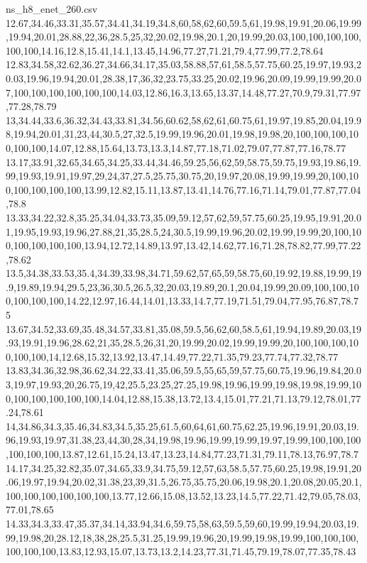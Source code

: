 \begin{filecontents*}[overwrite]{ns_h8_enet_260.csv}
12.67,34.46,33.31,35.57,34.41,34.19,34.8,60,58,62,60,59.5,61,19.98,19.91,20.06,19.99,19.94,20.01,28.88,22,36,28.5,25,32,20.02,19.98,20.1,20,19.99,20.03,100,100,100,100,100,100,14.16,12.8,15.41,14.1,13.45,14.96,77.27,71.21,79.4,77.99,77.2,78.64
12.83,34.58,32.62,36.27,34.66,34.17,35.03,58.88,57,61,58.5,57.75,60.25,19.97,19.93,20.03,19.96,19.94,20.01,28.38,17,36,32,23.75,33.25,20.02,19.96,20.09,19.99,19.99,20.07,100,100,100,100,100,100,14.03,12.86,16.3,13.65,13.37,14.48,77.27,70.9,79.31,77.97,77.28,78.79
13,34.44,33.6,36.32,34.43,33.81,34.56,60.62,58,62,61,60.75,61,19.97,19.85,20.04,19.98,19.94,20.01,31,23,44,30.5,27,32.5,19.99,19.96,20.01,19.98,19.98,20,100,100,100,100,100,100,14.07,12.88,15.64,13.73,13.3,14.87,77.18,71.02,79.07,77.87,77.16,78.77
13.17,33.91,32.65,34.65,34.25,33.44,34.46,59.25,56,62,59,58.75,59.75,19.93,19.86,19.99,19.93,19.91,19.97,29,24,37,27.5,25.75,30.75,20,19.97,20.08,19.99,19.99,20,100,100,100,100,100,100,13.99,12.82,15.11,13.87,13.41,14.76,77.16,71.14,79.01,77.87,77.04,78.8
13.33,34.22,32.8,35.25,34.04,33.73,35.09,59.12,57,62,59,57.75,60.25,19.95,19.91,20.01,19.95,19.93,19.96,27.88,21,35,28.5,24,30.5,19.99,19.96,20.02,19.99,19.99,20,100,100,100,100,100,100,13.94,12.72,14.89,13.97,13.42,14.62,77.16,71.28,78.82,77.99,77.22,78.62
13.5,34.38,33.53,35.4,34.39,33.98,34.71,59.62,57,65,59,58.75,60,19.92,19.88,19.99,19.9,19.89,19.94,29.5,23,36,30.5,26.5,32,20.03,19.89,20.1,20.04,19.99,20.09,100,100,100,100,100,100,14.22,12.97,16.44,14.01,13.33,14.7,77.19,71.51,79.04,77.95,76.87,78.75
13.67,34.52,33.69,35.48,34.57,33.81,35.08,59.5,56,62,60,58.5,61,19.94,19.89,20.03,19.93,19.91,19.96,28.62,21,35,28.5,26,31,20,19.99,20.02,19.99,19.99,20,100,100,100,100,100,100,14,12.68,15.32,13.92,13.47,14.49,77.22,71.35,79.23,77.74,77.32,78.77
13.83,34.36,32.98,36.62,34.22,33.41,35.06,59.5,55,65,59,57.75,60.75,19.96,19.84,20.03,19.97,19.93,20,26.75,19,42,25.5,23.25,27.25,19.98,19.96,19.99,19.98,19.98,19.99,100,100,100,100,100,100,14.04,12.88,15.38,13.72,13.4,15.01,77.21,71.13,79.12,78.01,77.24,78.61
14,34.86,34.3,35.46,34.83,34.5,35.25,61.5,60,64,61,60.75,62.25,19.96,19.91,20.03,19.96,19.93,19.97,31.38,23,44,30,28,34,19.98,19.96,19.99,19.99,19.97,19.99,100,100,100,100,100,100,13.87,12.61,15.24,13.47,13.23,14.84,77.23,71.31,79.11,78.13,76.97,78.7
14.17,34.25,32.82,35.07,34.65,33.9,34.75,59.12,57,63,58.5,57.75,60.25,19.98,19.91,20.06,19.97,19.94,20.02,31.38,23,39,31.5,26.75,35.75,20.06,19.98,20.1,20.08,20.05,20.1,100,100,100,100,100,100,13.77,12.66,15.08,13.52,13.23,14.5,77.22,71.42,79.05,78.03,77.01,78.65
14.33,34.3,33.47,35.37,34.14,33.94,34.6,59.75,58,63,59.5,59,60,19.99,19.94,20.03,19.99,19.98,20,28.12,18,38,28,25.5,31.25,19.99,19.96,20,19.99,19.98,19.99,100,100,100,100,100,100,13.83,12.93,15.07,13.73,13.2,14.23,77.31,71.45,79.19,78.07,77.35,78.43

\end{filecontents*}
